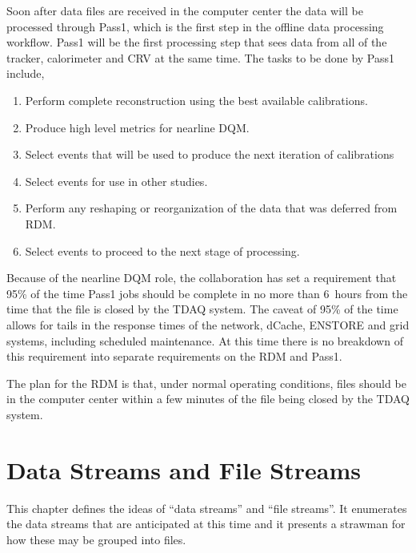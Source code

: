Soon after data files are received in the computer center the data will be processed
through Pass1, which is the first step in the offline data processing workflow.
Pass1 will be the first processing step that sees data from all of the tracker,
calorimeter and CRV at the same time.  The tasks to be done by Pass1 include,
\begin{enumerate}
  \item Perform complete reconstruction using the best available calibrations.
  \item Produce high level metrics for nearline DQM.
  \item Select events that will be used to produce the next iteration of calibrations
  \item Select events for use in other studies.
  \item Perform any reshaping or reorganization of the data that was deferred from RDM.
  \item Select events to proceed to the next stage of processing. 
\end{enumerate}

Because of the nearline DQM role, the collaboration has set a requirement that
95\% of the time Pass1 jobs should be complete in no more than 6~hours from the
time that the file is closed by the TDAQ system.
The caveat of 95\% of the time allows for tails in the response times of
the network, dCache, ENSTORE and grid systems, including scheduled maintenance.
At this time there is no breakdown of this requirement into separate requirements
on the RDM and Pass1.

The plan for the RDM is that, under normal operating conditions,
files should be in the computer center within a few minutes of the file being closed
by the TDAQ system.



\chapter{Data Streams and File Streams}
\label{ch:DataStreamsAndFileStreams}

This chapter defines the ideas of ``data streams'' and ``file streams''.
It enumerates the data streams that are anticipated at this time
and it presents a strawman for how these may be grouped into files.

